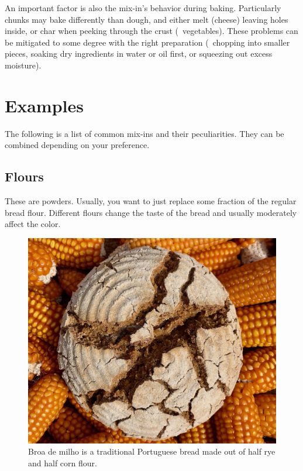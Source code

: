 An important factor is also the mix-in's behavior during baking. Particularly
chunks may bake differently than dough, and either melt (cheese) leaving holes
inside, or char when peeking through the crust (\eg~vegetables). These
problems can be mitigated to some degree with the right preparation (\eg~chopping
into smaller pieces, soaking dry ingredients in water or oil first,
or squeezing out excess moisture).

\section{Examples}

The following is a list of common mix-ins and their peculiarities. They can be
combined depending on your preference.

\subsection{Flours}
These are powders. Usually, you want to just replace some fraction of the
regular bread flour. Different flours change the taste of the bread and
usually moderately affect the color.

\begin{figure}[htb!]
  \centering
  \includegraphics[width=\textwidth]{broa}
  \caption[Broa de milho]{Broa de milho is a traditional Portuguese bread
  made out of half rye and half corn flour.}%
\end{figure}

